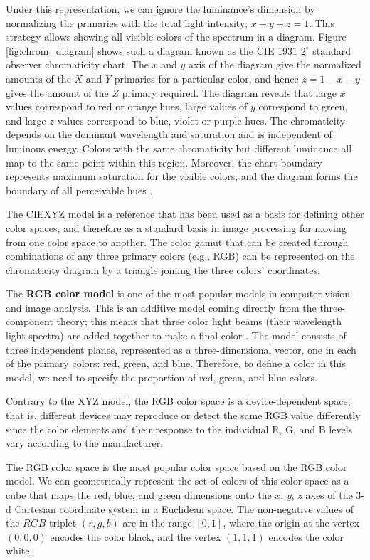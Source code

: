 Under this representation, we can ignore the luminance's dimension by normalizing the primaries with the total light intensity; $x+y+z=1$. This strategy allows showing all visible colors of the spectrum in a diagram. Figure \ref{fig:chrom_diagram} shows such a diagram known as the CIE 1931 $2^{\circ}$ standard observer chromaticity chart. The $x$ and $y$ axis of the diagram give the normalized amounts of the $X$ and $Y$ primaries for a particular color, and hence $z = 1 - x - y$ gives the amount of the $Z$ primary required. The diagram reveals that large $x$ values correspond to red or orange hues, large values of $y$ correspond to green, and large $z$ values correspond to blue, violet or purple hues. The chromaticity depends on the dominant wavelength and saturation and is independent of luminous energy. Colors with the same chromaticity but different luminance all map to the same point within this region. Moreover, the chart boundary represents maximum saturation for the visible colors, and the diagram forms the boundary of all perceivable hues \citep{Bull:Book:2014}. 

The CIEXYZ model is a reference that has been used as a basis for defining other color spaces, and therefore as a standard basis in image processing for moving from one color space to another. The color gamut that can be created through combinations of any three primary colors (e.g., RGB) can be represented on the chromaticity diagram by a triangle joining the three colors' coordinates.

The \textbf{RGB color model} is one of the most popular models in computer vision and image analysis. This is an additive model coming directly from the three-component theory; this means that three color light beams (their wavelength light spectra) are added together to make a final color \citep{Gonzalez.Woods:Book:2008}. The model consists of three independent planes, represented as a three-dimensional vector, one in each of the primary colors: red, green, and blue. Therefore, to define a color in this model, we need to specify the proportion of red, green, and blue colors.

Contrary to the XYZ model, the RGB color space is a device-dependent space; that is, different devices may reproduce or detect the same RGB value differently since the color elements and their response to the individual R, G, and B levels vary according to the manufacturer.

The RGB color space is the most popular color space based on the RGB color model. We can geometrically represent the set of colors of this color space as a cube that maps the red, blue, and green dimensions onto the $x$, $y$, $z$ axes of the 3-d Cartesian coordinate system in a Euclidean space. The non-negative values of the $RGB$ triplet $(r,g,b)$ are in the range $[0,1]$, where the origin at the vertex $(0,0,0)$ encodes the color black, and the vertex $(1,1,1)$ encodes the color white. 

